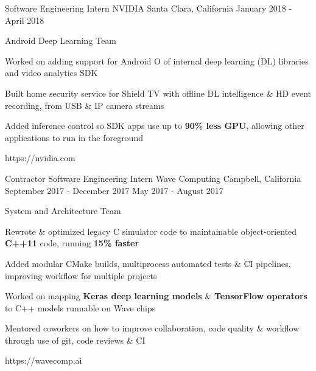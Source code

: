 


\begin{cventries}


\cventrylink
{Software Engineering Intern}
{NVIDIA}
{Santa Clara, California}
{January 2018 - April 2018}
{ %
Android Deep Learning Team
\begin{cvitems}
\item[]
\item{Worked on adding support for Android O of internal deep learning (DL) libraries and video analytics SDK}
\item{Built home security service for Shield TV with offline DL intelligence \& HD event recording, from USB \& IP camera streams}
\item{Added inference control so SDK apps use up to \textbf{90\% less GPU}, allowing other applications to run in the foreground}
\end{cvitems}
}
{https://nvidia.com}


\cventrylink
{Contractor \newline {\vspace{-.75mm}}
Software Engineering Intern}
{Wave Computing}
{Campbell, California}
{September 2017 - December 2017 \newline {\vspace{-1mm}}
May 2017 - August 2017}
{ %
System and Architecture Team
\begin{cvitems}
\item[]
\item {Rewrote \& optimized legacy C simulator code to maintainable object-oriented \textbf{C++11} code, running \textbf{15\% faster}}
\item {Added modular CMake builds, multiprocess automated tests \& CI pipelines, improving workflow for multiple projects}
\item {Worked on mapping \textbf{Keras deep learning models} \& \textbf{TensorFlow operators} to C++ models runnable on Wave chips}
\item {Mentored coworkers on how to improve collaboration, code quality \& workflow through use of git, code reviews \& CI}
\end{cvitems}
}
{https://wavecomp.ai}


\end{cventries}
